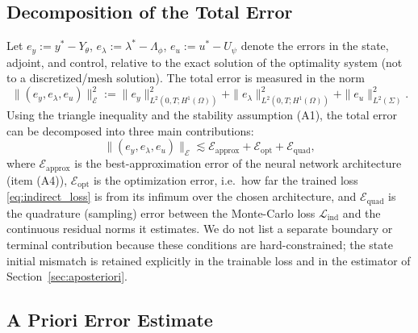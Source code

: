 \subsection{Decomposition of the Total Error}
\label{sec:error-decomposition}

Let $e_y := y^* - Y_\theta$, $e_\lambda := \lambda^* - \Lambda_\phi$, $e_u := u^* - U_\psi$ denote the errors in the state, adjoint, and control, relative to the exact solution of the optimality system (not to a discretized/mesh solution). The total error is measured in the norm
\begin{equation}
\| (e_y, e_\lambda, e_u) \|_{\mathcal{E}}^2 := \| e_y \|_{L^2(0,T;H^1(\Omega))}^2 + \| e_\lambda \|_{L^2(0,T;H^1(\Omega))}^2 + \| e_u \|_{L^2(\Sigma)}^2.
\end{equation}
Using the triangle inequality and the stability assumption (A1), the total error can be decomposed into three main contributions:
\begin{equation}
\label{eq:decomp}
\| (e_y, e_\lambda, e_u) \|_{\mathcal{E}} \lesssim \mathcal{E}_{\text{approx}} + \mathcal{E}_{\text{opt}} + \mathcal{E}_{\text{quad}},
\end{equation}
where $\mathcal{E}_{\text{approx}}$ is the best-approximation error of the neural network architecture (item (A4)), $\mathcal{E}_{\text{opt}}$ is the optimization error, i.e.\ how far the trained loss \eqref{eq:indirect_loss} is from its infimum over the chosen architecture, and $\mathcal{E}_{\text{quad}}$ is the quadrature (sampling) error between the Monte-Carlo loss $\mathcal{L}_{\text{ind}}$ and the continuous residual norms it estimates. We do not list a separate boundary or terminal contribution because these conditions are hard-constrained; the state initial mismatch is retained explicitly in the trainable loss and in the estimator of Section~\ref{sec:aposteriori}.

\subsection{A Priori Error Estimate}
\label{sec:apriori}

